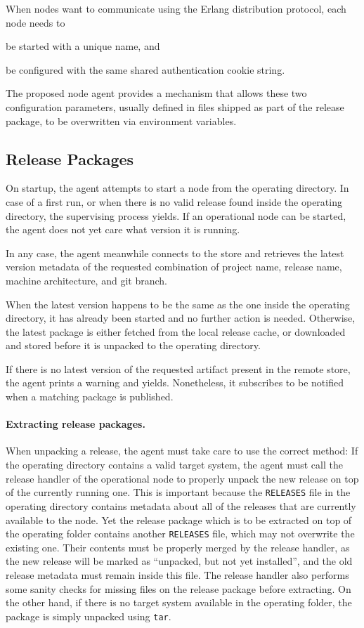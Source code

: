 When nodes want to communicate using the Erlang distribution protocol, each node needs to \begin{enumerate*}[label=(\roman*)] \item be started with a unique name, and \item be configured with the same shared authentication cookie string.\end{enumerate*} The proposed node agent provides a mechanism that allows these two configuration parameters, usually defined in files shipped as part of the release package, to be overwritten via environment variables.


\subsection{Release Packages}

On startup, the agent attempts to start a node from the operating directory. In case of a first run, or when there is no valid release found inside the operating directory, the supervising process yields. If an operational node can be started, the agent does not yet care what version it is running.

In any case, the agent meanwhile connects to the store and retrieves the latest version metadata of the requested combination of project name, release name, machine architecture, and git branch.

When the latest version happens to be the same as the one inside the operating directory, it has already been started and no further action is needed. Otherwise, the latest package is either fetched from the local release cache, or downloaded and stored before it is unpacked to the operating directory.

If there is no latest version of the requested artifact present in the remote store, the agent prints a warning and yields. Nonetheless, it subscribes to be notified when a matching package is published.


\paragraph{Extracting release packages.}
When unpacking a release, the agent must take care to use the correct method: If the operating directory contains a valid target system, the agent must call the release handler of the operational node to properly unpack the new release on top of the currently running one. This is important because the \lstinline|RELEASES| file in the operating directory contains metadata about all of the releases that are currently available to the node. Yet the release package which is to be extracted on top of the operating folder contains another \lstinline|RELEASES| file, which may not overwrite the existing one. Their contents must be properly merged by the release handler, as the new release will be marked as ``unpacked, but not yet installed'', and the old release metadata must remain inside this file. The release handler also performs some sanity checks for missing files on the release package before extracting. On the other hand, if there is no target system available in the operating folder, the package is simply unpacked using \lstinline|tar|.

